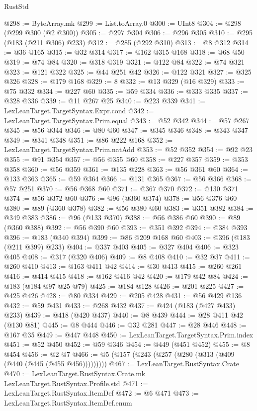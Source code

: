 \begin{lexlean}{RustStd}
\begin{coremodule}
@298 := ByteArray.mk
@299 := List.toArray.{0}
@300 := UInt8
@304 := @298 (@299 @300 (@2 @300))
@305 := @297 @304
@306 := @296 @305
@310 := @295 (@183 (@211 @306) @233)
@312 := @285 (@292 @310)
@313 := @8 @312
@314 := @36 @165
@315 := @32 @314
@317 := @162 @315 @168
@318 := @68 @50
@319 := @74 @84
@320 := @318 @319
@321 := @122 @84
@322 := @74 @321
@323 := @121 @322
@325 := @44 @251 @42
@326 := @122 @321
@327 := @325 @326
@328 := @179 @168
@329 := 8
@332 := @13 @329 (@16 @329)
@333 := @75 @332
@334 := @227 @60
@335 := @59 @334
@336 := @333 @335
@337 := @328 @336
@339 := @11 @267 @25
@340 := @223 @339
@341 := LexLeanTarget.TargetSyntax.Expr.cond
@342 := LexLeanTarget.TargetSyntax.Prim.equal
@343 := @52 @342
@344 := @57 @267
@345 := @56 @344
@346 := @80 @60
@347 := @345 @346
@348 := @343 @347
@349 := @341 @348
@351 := @86 @222 @168
@352 := LexLeanTarget.TargetSyntax.Prim.natAdd
@353 := @52 @352
@354 := @92 @23
@355 := @91 @354
@357 := @56 @355 @60
@358 := @227 @357
@359 := @353 @358
@360 := @56 @359
@361 := @135 @228
@363 := @56 @361 @60
@364 := @133 @363
@365 := @59 @364
@366 := @131 @365
@367 := @56 @366
@368 := @57 @251
@370 := @56 @368 @60
@371 := @367 @370
@372 := @130 @371
@374 := @56 @372 @60
@376 := @96 (@360 @374)
@378 := @56 @376 @60
@380 := @89 (@360 @378)
@382 := @56 @380 @60
@383 := @351 @382
@384 := @349 @383
@386 := @96 (@133 @370)
@388 := @56 @386 @60
@390 := @89 (@360 @388)
@392 := @56 @390 @60
@393 := @351 @392
@394 := @384 @393
@396 := @183 (@340 @394)
@399 := @86 @209 @168 @60
@403 := @396 (@183 (@211 @399) @233)
@404 := @337 @403
@405 := @327 @404
@406 := @323 @405
@408 := @317 (@320 @406)
@409 := @8 @408
@410 := @32 @37
@411 := @260 @410
@413 := @163 @411 @42
@414 := @30 @413
@415 := @260 @261
@416 := @414 @415
@418 := @162 @416 @42
@420 := @179 @42 @84
@424 := @183 (@184 @97 @25 @79)
@425 := @184 @128
@426 := @201 @225
@427 := @425 @426
@428 := @80 @334
@429 := @205 @428
@431 := @56 @429 @136
@432 := @59 @431
@433 := @268 @432
@437 := @424 (@183 (@427 @433) @233)
@439 := @418 (@420 @437)
@440 := @8 @439
@444 := @28 @411 @42 (@130 @81)
@445 := @8 @444
@446 := @32 @281
@447 := @28 @446
@448 := @167 @35
@449 := @447 @448
@450 := LexLeanTarget.TargetSyntax.Prim.index
@451 := @52 @450
@452 := @59 @346
@454 := @449 (@451 @452)
@455 := @8 @454
@456 := @2 @7
@466 := @5 (@157 (@243 (@257 (@280 (@313 (@409 (@440 (@445 (@455 @456)))))))))
@467 := LexLeanTarget.RustSyntax.Crate
@470 := LexLeanTarget.RustSyntax.Crate.mk LexLeanTarget.RustSyntax.Profile.std
@471 := LexLeanTarget.RustSyntax.ItemDef
@472 := @6 @471
@473 := LexLeanTarget.RustSyntax.ItemDef.enum

\end{coremodule}
\end{lexlean}
